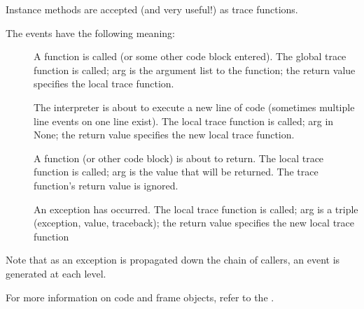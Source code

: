 Instance methods are accepted (and very useful!) as trace functions.

The events have the following meaning:

\begin{description}

\item[]
A function is called (or some other code block entered).  The global
trace function is called; arg is the argument list to the function;
the return value specifies the local trace function.

\item[]
The interpreter is about to execute a new line of code (sometimes
multiple line events on one line exist).  The local trace function is
called; arg in None; the return value specifies the new local trace
function.

\item[]
A function (or other code block) is about to return.  The local trace
function is called; arg is the value that will be returned.  The trace
function's return value is ignored.

\item[]
An exception has occurred.  The local trace function is called; arg is
a triple (exception, value, traceback); the return value specifies the
new local trace function

\end{description}

Note that as an exception is propagated down the chain of callers, an
 event is generated at each level.

For more information on code and frame objects, refer to the
.
